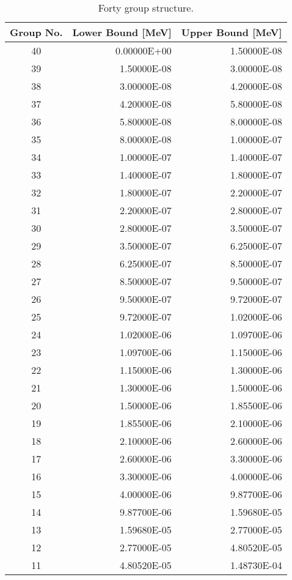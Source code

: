 \begin{appendices}
\begin{table}[h!]
  \centering	
  \footnotesize
  \caption{Forty group structure.}
  \label{table:app-40-groups} 
  \vspace{14pt}
  \begin{tabular}{c r r}
    \toprule
    {\bf Group No.} &
    {\bf Lower Bound [MeV]} &
    {\bf Upper Bound [MeV]} \\
    \midrule
40 & 0.00000E+00 & 1.50000E-08 \\
39 & 1.50000E-08 & 3.00000E-08 \\
38 & 3.00000E-08 & 4.20000E-08 \\
37 & 4.20000E-08 & 5.80000E-08 \\
36 & 5.80000E-08 & 8.00000E-08 \\
35 & 8.00000E-08 & 1.00000E-07 \\
34 & 1.00000E-07 & 1.40000E-07 \\
33 & 1.40000E-07 & 1.80000E-07 \\
32 & 1.80000E-07 & 2.20000E-07 \\
31 & 2.20000E-07 & 2.80000E-07 \\
30 & 2.80000E-07 & 3.50000E-07 \\
29 & 3.50000E-07 & 6.25000E-07 \\
28 & 6.25000E-07 & 8.50000E-07 \\
27 & 8.50000E-07 & 9.50000E-07 \\
26 & 9.50000E-07 & 9.72000E-07 \\
25 & 9.72000E-07 & 1.02000E-06 \\
24 & 1.02000E-06 & 1.09700E-06 \\
23 & 1.09700E-06 & 1.15000E-06 \\
22 & 1.15000E-06 & 1.30000E-06 \\
21 & 1.30000E-06 & 1.50000E-06 \\
20 & 1.50000E-06 & 1.85500E-06 \\
19 & 1.85500E-06 & 2.10000E-06 \\
18 & 2.10000E-06 & 2.60000E-06 \\
17 & 2.60000E-06 & 3.30000E-06 \\
16 & 3.30000E-06 & 4.00000E-06 \\
15 & 4.00000E-06 & 9.87700E-06 \\
14 & 9.87700E-06 & 1.59680E-05 \\
13 & 1.59680E-05 & 2.77000E-05 \\
12 & 2.77000E-05 & 4.80520E-05 \\
11 & 4.80520E-05 & 1.48730E-04 \\

\end{tabular}
\end{table}
\end{appendices}
